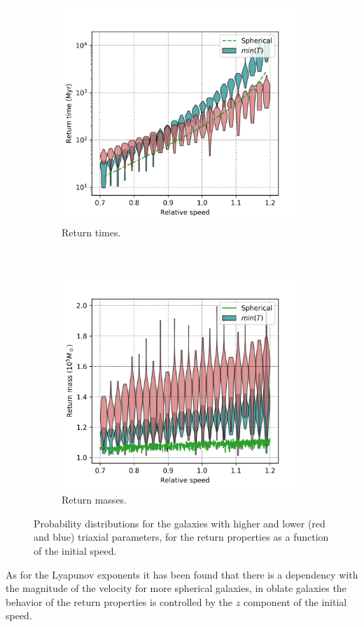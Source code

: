 	\begin{figure}[h]
		\centering
		\begin{subfigure}[t]{0.49\textwidth}
			\includegraphics[width = \linewidth]{"../Files/Week 13/rt_speed"}
			\caption{Return times.}
			\label{fig: timeSpeedDist}
		\end{subfigure}
		~ 
		\begin{subfigure}[t]{0.49\textwidth}
			\includegraphics[width = \linewidth]{"../Files/Week 13/rt_mass"}
			\caption{Return masses.}
			\label{fig: massSpeedDist}
		\end{subfigure}
		\caption{Probability distributions for the galaxies with higher and lower (red and blue) triaxial parameters, for the return properties as a function of the initial speed.}
		\label{fig: speedDist}
	\end{figure}
	As for the Lyapunov exponents it has been found that there is a dependency with the magnitude of the velocity for more spherical galaxies, in oblate galaxies the behavior of the return properties is controlled by the $z$ component of the initial speed.
	
